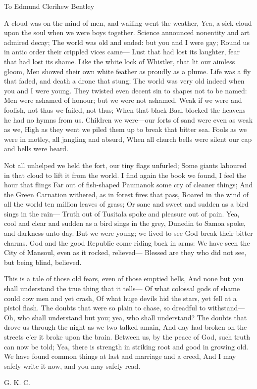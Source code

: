 \skiptorecto

To Edmund Clerihew Bentley

A cloud was on the mind of men, and wailing went the weather, Yea, a sick cloud upon the soul when we were boys together. Science announced nonentity and art admired decay; The world was old and ended: but you and I were gay; Round us in antic order their crippled vices came⁠— Lust that had lost its laughter, fear that had lost its shame. Like the white lock of Whistler, that lit our aimless gloom, Men showed their own white feather as proudly as a plume. Life was a fly that faded, and death a drone that stung; The world was very old indeed when you and I were young. They twisted even decent sin to shapes not to be named: Men were ashamed of honour; but we were not ashamed. Weak if we were and foolish, not thus we failed, not thus; When that black Baal blocked the heavens he had no hymns from us. Children we were⁠—our forts of sand were even as weak as we, High as they went we piled them up to break that bitter sea. Fools as we were in motley, all jangling and absurd, When all church bells were silent our cap and bells were heard.

Not all unhelped we held the fort, our tiny flags unfurled; Some giants laboured in that cloud to lift it from the world. I find again the book we found, I feel the hour that flings Far out of fish-shaped Paumanok some cry of cleaner things; And the Green Carnation withered, as in forest fires that pass, Roared in the wind of all the world ten million leaves of grass; Or sane and sweet and sudden as a bird sings in the rain⁠— Truth out of Tusitala spoke and pleasure out of pain. Yea, cool and clear and sudden as a bird sings in the grey, Dunedin to Samoa spoke, and darkness unto day. But we were young; we lived to see God break their bitter charms. God and the good Republic come riding back in arms: We have seen the City of Mansoul, even as it rocked, relieved⁠— Blessed are they who did not see, but being blind, believed.

This is a tale of those old fears, even of those emptied hells, And none but you shall understand the true thing that it tells⁠— Of what colossal gods of shame could cow men and yet crash, Of what huge devils hid the stars, yet fell at a pistol flash. The doubts that were so plain to chase, so dreadful to withstand⁠— Oh, who shall understand but you; yea, who shall understand? The doubts that drove us through the night as we two talked amain, And day had broken on the streets e’er it broke upon the brain. Between us, by the peace of God, such truth can now be told; Yea, there is strength in striking root and good in growing old. We have found common things at last and marriage and a creed, And I may safely write it now, and you may safely read.

G. K. C.
